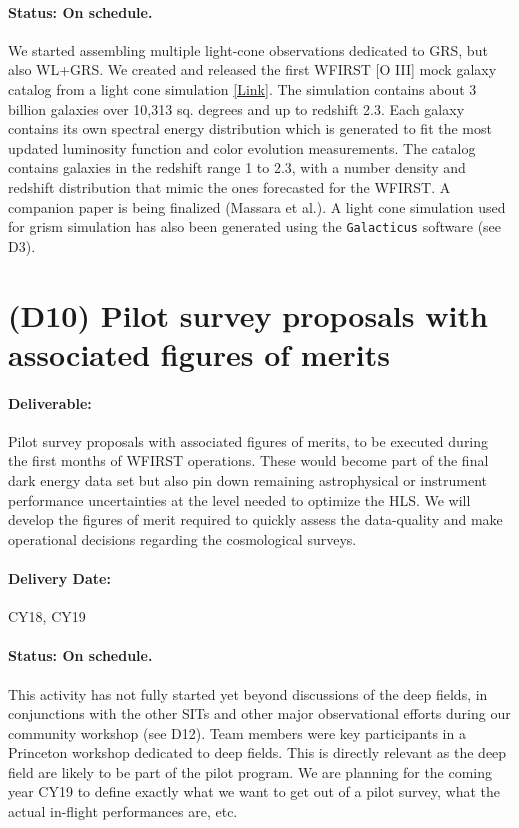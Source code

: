 \paragraph*{Status: On schedule.} We started assembling multiple light-cone observations dedicated to GRS, but also WL+GRS. We created and released the first WFIRST [O III] mock galaxy catalog from a light cone simulation \href{http://www.wfirst-hls-cosmology.org/products/}{[Link]}. The simulation contains about 3 billion galaxies over 10,313 sq. degrees and up to redshift 2.3. Each galaxy contains its own spectral energy distribution which is generated to fit the most updated luminosity function and color evolution measurements. The catalog contains galaxies in the redshift range 1 to 2.3, with a number density and redshift distribution that mimic the ones forecasted for the WFIRST. A companion paper is being finalized (Massara et al.). A light cone simulation used for grism simulation has also been generated using the \texttt{Galacticus} software (see D3).




\section*{(D10) Pilot survey proposals with associated figures of merits}

\paragraph*{Deliverable:} Pilot survey proposals with associated figures of merits, to be executed during the first months of WFIRST operations. These would become
part of the final dark energy data set but also pin down remaining astrophysical
or instrument performance uncertainties at the level needed to optimize the HLS.
We will develop the figures of merit required to quickly assess the data-quality
and make operational decisions regarding the cosmological surveys.

\paragraph*{Delivery Date:} CY18, CY19

\paragraph*{Status: On schedule.} This activity has not fully started yet beyond discussions of the deep fields, in conjunctions with the other SITs and other major observational efforts during our community workshop (see D12). Team members were key participants in a Princeton workshop dedicated to deep fields. This is directly relevant as the deep field are likely to be part of the pilot program. We are planning for the coming year CY19 to define exactly what we want to get out of a pilot survey, what the actual in-flight performances are, etc.

